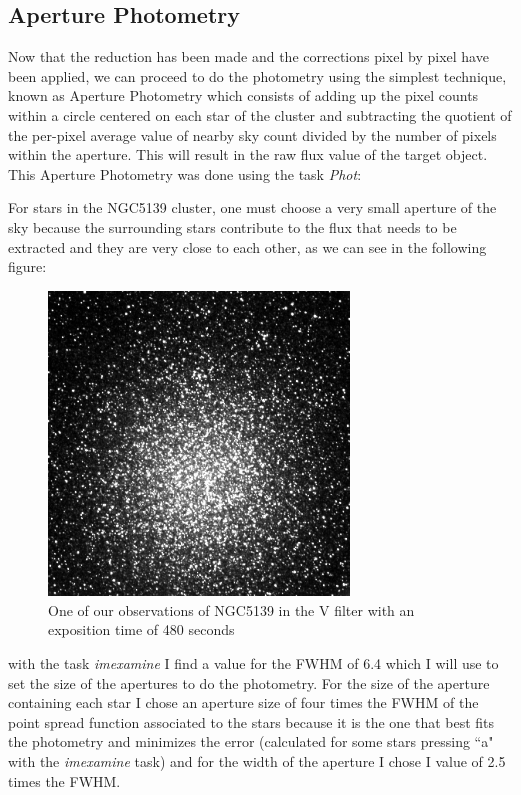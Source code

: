 \subsection{Aperture Photometry}

Now that the reduction has been made and the corrections pixel by pixel have been applied, we can proceed to do the photometry using the simplest technique, known as Aperture Photometry which consists of adding up the pixel counts within a circle centered on each star of the cluster and subtracting the quotient of the per-pixel average value of nearby sky count divided by the number of pixels within the aperture. This will result in the raw flux value of the target object. This Aperture Photometry was done using the task \textit{Phot}:

For stars in the NGC5139 cluster, one must choose a very small aperture of the sky because the surrounding stars contribute to the flux that needs to be extracted and they are very close to each other, as we can see in the following figure: 

\begin{figure}[H]
\centering
\includegraphics[width=8cm]{images/NGC5139_red.png}
\caption[NGC5139 as observed in the V filter]{One of our observations of NGC5139 in the V filter with an exposition time of 480 seconds}
\end{figure}

with the task \textit{imexamine} I find a value for the FWHM of 6.4 which I will use to set the size of the apertures to do the photometry. For the size of the aperture containing each star I chose an aperture size of four times the FWHM of the point spread function associated to the stars because it is the one that best fits the photometry and minimizes the error (calculated for some stars pressing ``a" with the \textit{imexamine} task) and for the width of the aperture I chose I value of 2.5 times the FWHM.

